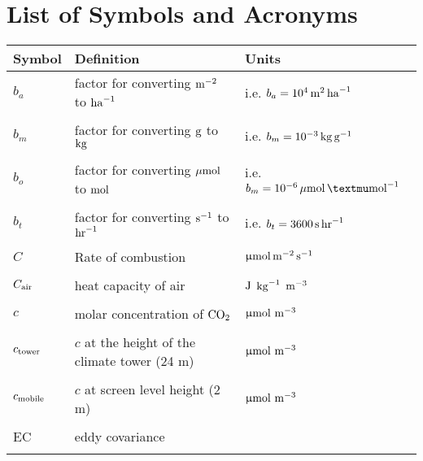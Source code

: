 \chapter{List of Symbols and Acronyms}

\begin{longtable}{L{3cm}L{6cm}L{3cm}}

 \toprule 
Symbol 			&	Definition  		&	Units	\\
\midrule 
$b_a$		& 	factor for converting $\rm{m}^{-2}$ to $\rm{ha}^{-1}$ & 	i.e. $b_a = 10^{4}\,\rm{m}^{2}\,\rm{ha}^{-1}$ \\\\

$b_m$		& 	factor for converting $\rm{g}$ to $\rm{kg}$ 	& i.e. $b_m = 10^{-3}\, \rm{kg}\, \rm{g}^{-1}$ \\\\

$b_o$		& 	factor for converting $\mu\rm{mol}$ to $\rm{mol}$ & i.e. $b_m = 10^{-6}\, \mu\rm{mol}\, \rm{µmol}^{-1}$ \\\\

$b_t$ 		& 	factor for converting $\rm{s}^{-1}$ to $\rm{hr}^{-1}$ 	& i.e. $b_t = 3600\,\rm{s}\,\rm{hr}^{-1}$ \\\\

${C}$ & Rate of combustion & $\upmu\rm{mol\, m^{-2}\, s^{-1}}$ \\\\

$C_{\rm{air}}$ & heat capacity of air & $\rm{J}$ $\rm{kg}^{-1}$ $\rm{m}^{-3}$ \\\\

$c$			& 	molar concentration of $\rm{CO}_2$	&  $\upmu\rm{mol\ m^{-3}}$ \\\\

$c_{\rm{tower}}$	& $c$ at the height of the climate tower (24 m) 	& $\upmu\rm{mol\ m^{-3}}$ \\\\

$c_{\rm{mobile}}$	& $c$ at screen level height (2 m) 	& $\upmu\rm{mol\ m^{-3}}$ \\\\

EC & eddy covariance & \\\\


\end{longtable}
